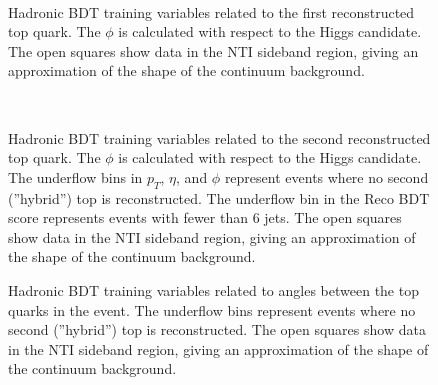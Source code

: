 \begin{figure}[htbp]
  \centering
	 \\
  \caption{Hadronic BDT training variables related to the first reconstructed top quark. The $\phi$ is calculated with respect to the Higgs candidate.  The open squares show data in the NTI sideband region, giving an approximation of the shape of the continuum background. }
  \label{fig:hadvbls2}
\end{figure}

\begin{figure}[htbp]
  \centering
	 \\
  \caption{Hadronic BDT training variables related to the second reconstructed top quark. The $\phi$ is calculated with respect to the Higgs candidate. The underflow bins in $p_{T}$, $\eta$, and $\phi$ represent events where no second (''hybrid'') top is reconstructed. The underflow bin in the Reco BDT score represents events with fewer than 6 jets.  The open squares show data in the NTI sideband region, giving an approximation of the shape of the continuum background. }
  \label{fig:hadvbls3}
\end{figure}

\begin{figure}[htbp]
  \centering
  \caption{Hadronic BDT training variables related to angles between the top quarks in the event. The underflow bins represent events where no second (''hybrid'') top is reconstructed. The open squares show data in the NTI sideband region, giving an approximation of the shape of the continuum background. }
  \label{fig:hadvbls4}
\end{figure}


